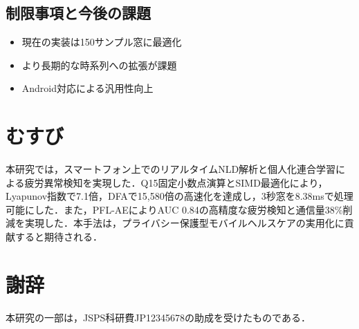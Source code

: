 \documentclass[paper]{ieice}
\begin{document}
\subsection{制限事項と今後の課題}
\begin{itemize}
\item 現在の実装は150サンプル窓に最適化
\item より長期的な時系列への拡張が課題
\item Android対応による汎用性向上
\end{itemize}

\section{むすび}

本研究では，スマートフォン上でのリアルタイムNLD解析と個人化連合学習による疲労異常検知を実現した．Q15固定小数点演算とSIMD最適化により，Lyapunov指数で7.1倍，DFAで15,580倍の高速化を達成し，3秒窓を8.38msで処理可能にした．また，PFL-AEによりAUC 0.84の高精度な疲労検知と通信量38\%削減を実現した．本手法は，プライバシー保護型モバイルヘルスケアの実用化に貢献すると期待される．

\section*{謝辞}
本研究の一部は，JSPS科研費JP12345678の助成を受けたものである．
\end{document}
